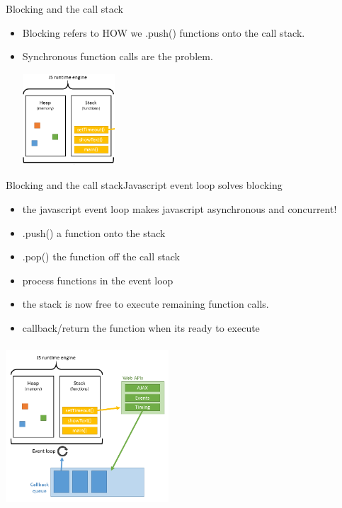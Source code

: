 \documentclass{beamer}
\begin{document}
\begin{frame}{Blocking and the call stack}{}
	\begin{itemize}
		\item Blocking refers to HOW we .push() functions onto the call stack.
		\vspace{1em}
		\item Synchronous function calls are the problem.
		\vspace{2em}
		\begin{center}
			\includegraphics[width=130px, height=130px]{js_runtime.png}
		\end{center}
	\end{itemize}
\end{frame}

\begin{frame}{Blocking and the call stack}{Javascript event loop solves blocking}
	\begin{itemize}
		\item the javascript event loop makes javascript asynchronous and concurrent!
		\vspace{2em}
		\item .push() a function onto the stack
		\vspace{1em}
		\item .pop() the function off the call stack
		\item process functions in the event loop
		\pause
		\item the stack is now free to execute remaining function calls.
		\vspace{2em}
		\pause
		\item callback/return the function when its ready to execute 

	\end{itemize}
\end{frame}


\begin{frame}
	\begin{center}
		\includegraphics[width=230px, height=230px]{js_runtime2.png}
	\end{center}
\end{frame}
\end{document}
